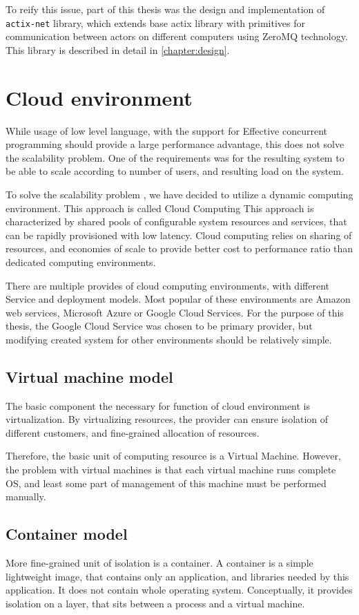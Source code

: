 To reify this issue, part of this thesis was the design and implementation of \verb|actix-net| library, which extends
base actix library with primitives for communication between actors on different computers using ZeroMQ technology.
This library is described in detail in \autoref{chapter:design}.

\section{Cloud environment}
While usage of low level language, with the support for Effective concurrent programming should provide a large performance
advantage, this does not solve the scalability problem. One of the requirements was for the resulting system to
be able to scale according to number of users, and resulting load on the system.

To solve the scalability problem , we have decided to utilize a dynamic computing environment. This approach is called Cloud Computing\cite{wiki:cloud}
This approach is characterized by shared pools of configurable system resources and services, that can be rapidly provisioned
with low latency. Cloud computing relies on sharing of resources, and economies of scale to provide better
cost to performance ratio than dedicated computing environments.

There are multiple provides of cloud computing environments, with different Service and deployment models.
Most popular of these environments are Amazon web services, Microsoft Azure or Google Cloud Services. For the purpose of
this thesis, the Google Cloud Service was chosen to be primary provider, but modifying created system for other
environments should be relatively simple.

\subsection{Virtual machine model}
The basic component the necessary for function of cloud environment is virtualization. By virtualizing resources,
the provider can ensure isolation of different customers, and fine-grained allocation of resources.

Therefore, the basic unit of computing resource is a Virtual Machine. However, the problem with virtual machines
is that each virtual machine runs complete OS, and least some part of management of this machine
must be performed manually.

\subsection{Container model}
More fine-grained unit of isolation is a container. A container is a simple lightweight image, that contains
only an application, and libraries needed by this application. It does not contain whole operating system.
Conceptually, it provides isolation on a layer, that sits between a process and a virtual machine.

